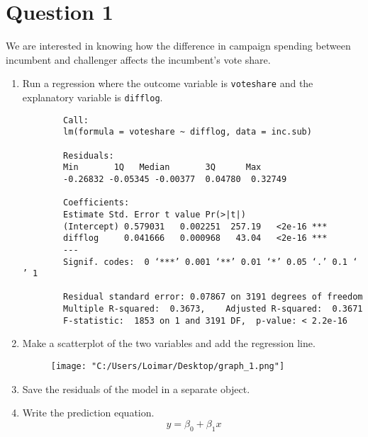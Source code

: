 \documentclass[12pt,letterpaper]{article}
\begin{document}
\section*{Question 1}
\vspace{.25cm}
\noindent We are interested in knowing how the difference in campaign spending between incumbent and challenger affects the incumbent's vote share. 
	\begin{enumerate}
		\item Run a regression where the outcome variable is \texttt{voteshare} and the explanatory variable is \texttt{difflog}.
		
		
	
	\begin{BVerbatim}
		Call:
		lm(formula = voteshare ~ difflog, data = inc.sub)
		
		Residuals:
		Min       1Q   Median       3Q      Max 
		-0.26832 -0.05345 -0.00377  0.04780  0.32749 
		
		Coefficients:
		Estimate Std. Error t value Pr(>|t|)    
		(Intercept) 0.579031   0.002251  257.19   <2e-16 ***
		difflog     0.041666   0.000968   43.04   <2e-16 ***
		---
		Signif. codes:  0 ‘***’ 0.001 ‘**’ 0.01 ‘*’ 0.05 ‘.’ 0.1 ‘ ’ 1
		
		Residual standard error: 0.07867 on 3191 degrees of freedom
		Multiple R-squared:  0.3673,	Adjusted R-squared:  0.3671 
		F-statistic:  1853 on 1 and 3191 DF,  p-value: < 2.2e-16
	\end{BVerbatim}
			\vspace{5cm}
		\item Make a scatterplot of the two variables and add the regression line.
		
		
		\begin{figure}[h!]
			\centering
			\texttt{[image: "C:/Users/Loimar/Desktop/graph\_1.png"]}
			\label{fig:plot_1}
		\end{figure}
	
		 	\vspace{7cm}
		\item Save the residuals of the model in a separate object.	
		
		\vspace{0.7cm}
		\item Write the prediction equation.
		\begin{equation}
			\ y = \beta_0 + \beta_1 x
		\end{equation}
	\end{enumerate}
	
\end{document}
